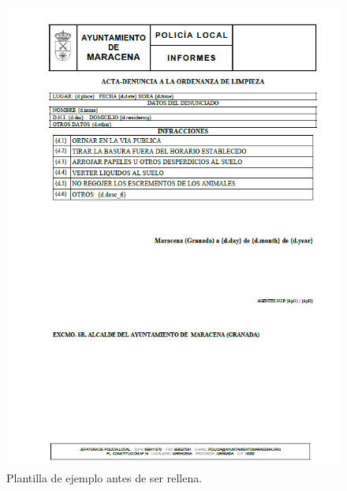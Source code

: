 \begin{figure}[H]
	\centering
	\includegraphics[scale=0.75]{imagenes/clean-template.png}
	\caption{Plantilla de ejemplo antes de ser rellena.}
\end{figure}

